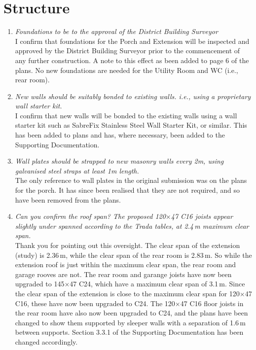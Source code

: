 \documentclass{extension}
\begin{document}
\section{Structure}
\begin{enumerate}
\item {\it Foundations to be to the approval of the District Building Surveyor}\\
I confirm that foundations for the Porch and Extension will be inspected and approved by the District Building Surveyor prior to the commencement of any further construction. A note to this effect as been added to page 6 of the plans. No new foundations are needed for the Utility Room and WC (i.e., rear room).
\item {\it New walls should be suitably bonded to existing walls. i.e., using a proprietary wall starter kit.}\\
I confirm that new walls will be bonded to the existing walls using a wall starter kit such as SabreFix Stainless Steel Wall Starter Kit, or similar.\cite{starterkit} This has been added to plans and has, where necessary, been added to the Supporting Documentation.
\item {\it Wall plates should be strapped to new masonry walls every 2m, using galvanised steel straps at least 1m length.}\\
The only reference to wall plates in the original submission was on the plans for the porch. It has since been realised that they are not required, and so have been removed from the plans.
\item {\it Can you confirm the roof span? The proposed 120$\times$47 C16 joists appear slightly under spanned according to the Trada tables, at 2.4\,m maximum clear span.}\\
Thank you for pointing out this oversight. The clear span of the extension (study) is 2.36\,m, while the clear span of the rear room is 2.83\,m. So while the extension roof is just within the maximum clear span, the rear room and garage rooves are not. The rear room and garange joists have now been upgraded to 145$\times$47 C24, which have a maximum clear span of 3.1\,m. Since the clear span of the extension is close to the maximum clear span for 120$\times$47 C16, these have now been upgraded to C24. The 120$\times$47 C16 floor joists in the rear room have also now been upgraded to C24, and the plans have been changed to show them supported by sleeper walls with a separation of 1.6\,m between supports. Section 3.3.1 of the Supporting Documentation has been changed accordingly.

\end{enumerate}
\end{document}
